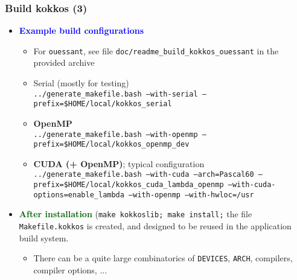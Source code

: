 \begin{frame}
  \frametitle{Build kokkos (3)}

  \begin{itemize}
  \item \textcolor{blue}{\textbf{Example build configurations}}
    \begin{itemize}
    \item For \texttt{ouessant}, see file \texttt{doc/readme\_build\_kokkos\_ouessant} in the provided archive
    \item Serial (mostly for testing)\\
      \texttt{../generate\_makefile.bash --with-serial --prefix=\$HOME/local/kokkos\_serial}
    \item \textbf{OpenMP}\\
      \texttt{../generate\_makefile.bash --with-openmp --prefix=\$HOME/local/kokkos\_openmp\_dev}
    \item \textbf{CUDA (+ OpenMP)}; typical configuration\\
      \texttt{../generate\_makefile.bash --with-cuda --arch=Pascal60 --prefix=\$HOME/local/kokkos\_cuda\_lambda\_openmp --with-cuda-options=enable\_lambda --with-openmp --with-hwloc=/usr}
    \end{itemize}
  \item \textcolor{darkgreen}{\textbf{After installation}} (\texttt{make kokkoslib; make install;} the file \texttt{Makefile.kokkos} is created, and designed to be reused in the application build system.
    \begin{itemize}
    \item There can be a quite large combinatorics of \texttt{DEVICES}, \texttt{ARCH}, compilers, compiler options, ...
    \end{itemize}
  \end{itemize}
  
\end{frame}

